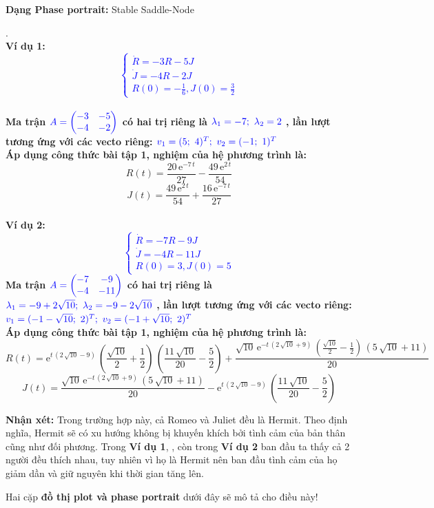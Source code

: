 \textbf{Dạng Phase portrait: } Stable Saddle-Node
\pagebreak
\begin{tcbdoublebox}[title={4. Hermit and Hermit}]
\mdseries .\\
\bfseries Ví dụ 1: \\
\textcolor{blue}{$$\left\{\begin{matrix}
\dot{R} =  -3R -5J \\ 
\dot{J} =  -4R-2J\\ 
R(0)= -\frac{1}{6}, J(0)=\frac{3}{2}
\end{matrix}\right.$$}\\
\mdseries Ma trận $\color{blue}A=\begin{pmatrix}
-3 & -5\\ 
-4 & -2
\end{pmatrix}$ có hai trị riêng là 
$\color{blue}\lambda_{1}=-7;\ \lambda_{2}=2$
, lần lượt tương ứng với các vecto riêng:
$\color{blue}v_{1} = (5;\ 4)^{T};\ v_{2}=(-1;\ 1)^{T}$\\Áp dụng công thức bài tập 1, nghiệm của hệ phương trình là:
$$R(t)=\frac{20\,{\mathrm{e}}^{-7\,t}}{27}-\frac{49\,{\mathrm{e}}^{2\,t}}{54} $$
$$J(t)=\frac{49\,{\mathrm{e}}^{2\,t}}{54}+\frac{16\,{\mathrm{e}}^{-7\,t}}{27}$$
\\
\bfseries Ví dụ 2:\\
\textcolor{blue}{$$\left\{\begin{matrix}
\dot{R} =  -7R -9J \\ 
\dot{J} =  -4R -11J\\ 
R(0)= 3, J(0)=5
\end{matrix}\right.$$}
\mdseries Ma trận $\color{blue}A=\begin{pmatrix}
-7 & -9\\ 
-4 & -11
\end{pmatrix}$ có hai trị riêng là 
$\color{blue}\lambda_{1}=-9+2\sqrt{10};\ \lambda_{2}=-9-2\sqrt{10}$
, lần lượt tương ứng với các vecto riêng:
$\color{blue}v_{1} = (-1-\sqrt{10};\ 2)^{T};\ v_{2}=(-1+\sqrt{10};\ 2)^{T}$\\Áp dụng công thức bài tập 1, nghiệm của hệ phương trình là:
$$R(t)={\mathrm{e}}^{t\,\left(2\,\sqrt{10}-9\right)}\,\left(\frac{\sqrt{10}}{2}+\frac{1}{2}\right)\,\left(\frac{11\,\sqrt{10}}{20}-\frac{5}{2}\right)+\frac{\sqrt{10}\,{\mathrm{e}}^{-t\,\left(2\,\sqrt{10}+9\right)}\,\left(\frac{\sqrt{10}}{2}-\frac{1}{2}\right)\,\left(5\,\sqrt{10}+11\right)}{20}$$
$$J(t)=\frac{\sqrt{10}\,{\mathrm{e}}^{-t\,\left(2\,\sqrt{10}+9\right)}\,\left(5\,\sqrt{10}+11\right)}{20}-{\mathrm{e}}^{t\,\left(2\,\sqrt{10}-9\right)}\,\left(\frac{11\,\sqrt{10}}{20}-\frac{5}{2}\right)$$

\textbf{Nhận xét: } Trong trường hợp này, cả Romeo và Juliet đều là Hermit. Theo định nghĩa, Hermit sẽ có xu hướng không bị khuyến khích bởi tình cảm của bản thân
cũng như đối phương. Trong \textbf{Ví dụ 1}, , còn trong \textbf{Ví dụ 2} ban đầu ta thấy cả 2 người đều thích nhau, tuy nhiên vì họ là Hermit nên
ban đầu tình cảm của họ giảm dần và giữ nguyên khi thời gian tăng lên.

Hai cặp \textbf{đồ thị plot và phase portrait} dưới đây sẽ mô tả cho điều này!
\end{tcbdoublebox}
